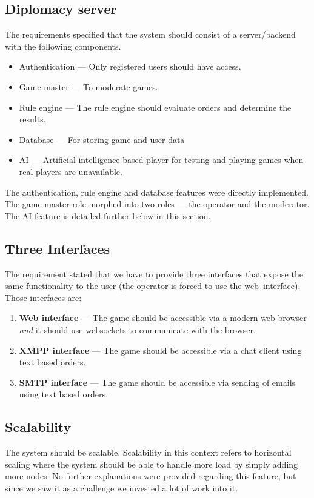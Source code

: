 \documentclass[11pt,a4paper]{report}
\begin{document}
\subsection{Diplomacy server}
The requirements specified that the system should consist of
a server/backend with the following components.

\begin{itemize}
\item Authentication --- Only registered users should have access.
\item Game master --- To moderate games.
\item Rule engine --- The rule engine should evaluate orders and determine
      the results.
\item Database --- For storing game and user data
\item AI --- Artificial intelligence based player for testing and playing games
      when real players are unavailable.
\end{itemize}

The authentication, rule engine and database features were directly
implemented. The game master role morphed into two roles --- the operator and
the moderator. The AI feature is detailed further below in this section.

\subsection{Three Interfaces}
The requirement stated that we have to provide three interfaces that expose
the same functionality to the user (the operator is forced to use the
web~interface). Those interfaces are:\\
\begin{enumerate}
\item {\bf Web interface} ---
  The game should be accessible via a modern web browser {\em and\/} it should
  use websockets to communicate with the browser.
\item {\bf XMPP interface} ---
  The game should be accessible via a chat client using text based orders.
\item {\bf SMTP interface} ---
  The game should be accessible via sending of emails using text based orders.
\end{enumerate}

\subsection{Scalability}
The system should be scalable. Scalability in this context refers to horizontal
scaling where the system should be able to handle more load by simply adding
more nodes. No further explanations were provided regarding this feature, but
since we saw it as a challenge we invested a lot of work into it.
\end{document}
